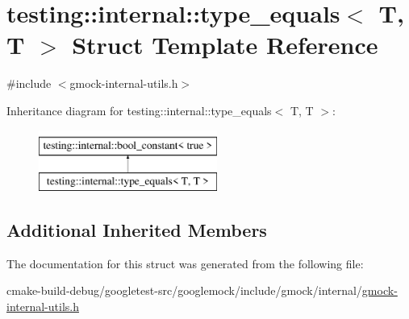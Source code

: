 \hypertarget{structtesting_1_1internal_1_1type__equals_3_01T_00_01T_01_4}{}\section{testing\+::internal\+::type\+\_\+equals$<$ T, T $>$ Struct Template Reference}
\label{structtesting_1_1internal_1_1type__equals_3_01T_00_01T_01_4}


{\ttfamily \#include $<$gmock-\/internal-\/utils.\+h$>$}

Inheritance diagram for testing\+::internal\+::type\+\_\+equals$<$ T, T $>$\+:\begin{figure}[H]
\begin{center}
\leavevmode
\includegraphics[height=2.000000cm]{structtesting_1_1internal_1_1type__equals_3_01T_00_01T_01_4}
\end{center}
\end{figure}
\subsection*{Additional Inherited Members}


The documentation for this struct was generated from the following file\+:\begin{DoxyCompactItemize}
\item 
cmake-\/build-\/debug/googletest-\/src/googlemock/include/gmock/internal/\mbox{\hyperlink{gmock-internal-utils_8h}{gmock-\/internal-\/utils.\+h}}\end{DoxyCompactItemize}
